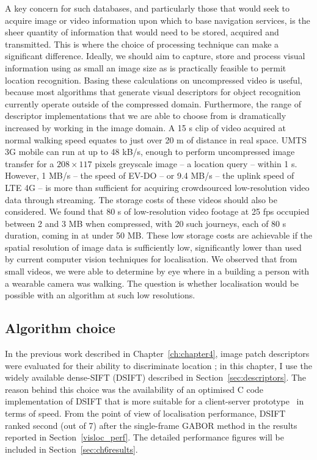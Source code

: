 A key concern for such databases, and particularly those that would seek to acquire image or video information upon which to base navigation services, is the sheer quantity of information that would need to be stored, acquired and transmitted.  This is where the choice of processing technique can make a significant difference.  Ideally, we should aim to capture, store and process visual information using as small an image size as is practically feasible to permit location recognition.  Basing these calculations on uncompressed video is useful, because most algorithms that generate visual descriptors for object recognition currently operate outside of the compressed domain. Furthermore, the range of descriptor implementations that we are able to choose from is dramatically increased by working in the image domain.  A 15 s clip of video acquired at normal walking speed equates to just over 20 m of distance in real space. UMTS 3G mobile can run at up to 48 kB/s, enough to perform uncompressed image transfer for a $208 \times 117$ pixels greyscale image -- a location query -- within 1 s.  However, 1 MB/s -- the speed of EV-DO \citep{bhushan2006cdma2000} -- or 9.4 MB/s -- the uplink speed of LTE 4G --  is more than sufficient for acquiring crowdsourced low-resolution video data through streaming.  The storage costs of these videos should also be considered.  We found that 80 s of low-resolution video footage at 25 fps occupied between 2 and 3 MB when compressed, with 20 such journeys, each of 80 s duration, coming in at under 50 MB.  These low storage costs are achievable if the spatial resolution of image data is sufficiently low, significantly lower than used by current computer vision techniques for localisation. We observed that from small videos, we were able to determine by eye where in a building a person with a wearable camera was walking. The question is whether localisation would be possible with an algorithm at such low resolutions.  

\subsection{Algorithm choice} In the previous work described in Chapter~\ref{ch:chapter4}, image patch descriptors were evaluated for their ability to discriminate location \citep{Rivera-Rubio2015PRL}; in this chapter, I use the widely available dense-SIFT (DSIFT) described in Section~\ref{sec:descriptors}. The reason behind this choice was the availability of an optimised C code implementation of DSIFT that is more suitable for a client-server prototype~\cite{Vedaldi2008} in terms of speed. From the point of view of localisation performance, DSIFT ranked second (out of 7) after the single-frame GABOR method in the results reported in Section~\ref{visloc_perf}. The detailed performance figures will be included in Section~\ref{sec:ch6results}.

